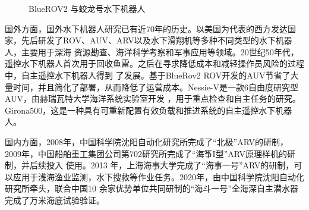 \begin{figure}[!ht]
  \setlength{\subfigcapskip}{-1bp}
  \centering
  \newsavebox{\standardrov}
  \begin{minipage}{\textwidth}
    \centering
    \hspace{0.8em}
  \end{minipage}

  \caption{BlueROV2 与蛟龙号水下机器人}
  \label{fig:rov-comparison}
\end{figure}

国外方面，国外水下机器人研究已有近70年的历史。以美国为代表的西方发达国家，先后研发了ROV、AUV、ARV以及水下滑翔机等多种不同类型的水下机器人，主要用于深海
资源勘查、海洋科学考察和军事应用等领域。20世纪50年代，遥控水下机器人首次用于回收鱼雷。之后在寻求降低成本和减轻操作员风险的过程中，自主遥控水下机器人得到
了发展。基于BlueRov2 ROV开发的AUV节省了大量时间，并且简化了部署，从而降低了运营成本。Nessie-V是一款6自由度研究型AUV，由赫瑞瓦特大学海洋系统实验室开发
，用于重点检查和自主任务的研究。Girona500，这是一种具有可重新配置有效负载和推进系统的自主遥控水下机器人。

国内方面，2008年，中国科学院沈阳自动化研究所完成了“北极”ARV的研制，2009年，中国船舶重工集团公司第702研究所完成了“海筝I型”ARV原理样机的研制，并后续投入
使用。2013 年，上海海事大学完成了“海事一号”ARV的研制，可以应用于浅海渔业监测，水下搜救等作业任务。2020年，由中国科学院沈阳自动化研究所牵头，联合中国10
余家优势单位共同研制的“海斗一号”全海深自主潜水器完成了万米海底试验验证。


